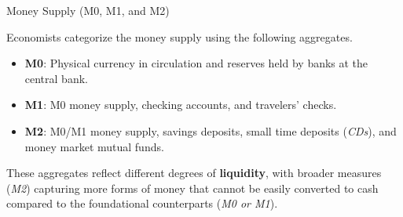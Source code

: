\documentclass[10pt]{article}
\begin{document}
    \begin{core}{Money Supply (M0, M1, and M2)}
      
      Economists categorize the money supply using the following aggregates.

      \begin{itemize}

        \item \textbf{M0}: Physical currency in circulation and reserves held by banks at the central bank.

        \item \textbf{M1}: M0 money supply, checking accounts, and travelers' checks.

        \item \textbf{M2}: M0/M1 money supply, savings deposits, small time deposits (\textit{CDs}), and money market mutual funds.

      \end{itemize}


      These aggregates reflect different degrees of \textbf{liquidity}, with broader measures (\textit{M2}) capturing more forms of money that cannot be easily converted to cash compared to the foundational counterparts (\textit{M0 or M1}).

    \end{core}
\end{document}
